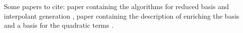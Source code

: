 Some papers to cite: paper containing the algorithms for reduced basis and interpolant generation
\citep{Field_2014}, paper containing the description of enriching the basis and a basis for the quadratic terms
\citep{2016arXiv160408253S}.